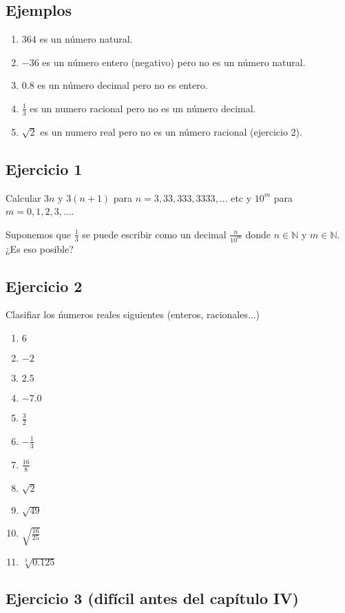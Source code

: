 \subsection*{Ejemplos}

\begin{enumerate}
\item $364$ es un número natural.
\item $-36$ es un número entero (negativo) pero no es un número natural.
\item $0.8$ es un número decimal pero no es entero.
\item $\frac{1}{3}$ es un numero racional pero no es un número decimal.
\item $\sqrt{2}$ es un numero real pero no es un número racional (ejercicio 2).
\end{enumerate}

\subsection*{Ejercicio 1}

Calcular $3n$ y $3{(n+1)}$ para $n = 3, 33, 333, 3333, \ldots$ etc y $10^m$ para
$m = 0, 1, 2, 3, \ldots$.

Suponemos que $\frac{1}{3}$ se puede escribir como un decimal
$\frac{n}{10^m}$ donde $n \in \mathbb N$ y $m \in \mathbb N$. ¿Es eso posible?

\subsection*{Ejercicio 2}

Clasifiar los ńumeros reales siguientes (enteros, racionales...)

\begin{enumerate}
\item $6$
\item $-2$
\item $2.5$
\item $-7.0$
\item $\frac{3}{2}$
\item $-\frac{1}{3}$
\item $\frac{16}{8}$
\item $\sqrt{2}$
\item $\sqrt{49}$
\item $\sqrt{\frac{16}{25}}$
\item $\sqrt[3]{0.125}$
\end{enumerate}

\subsection*{Ejercicio 3 (difícil antes del capítulo IV)}


